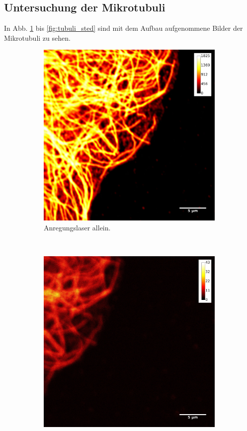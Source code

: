 \subsection{Untersuchung der Mikrotubuli}
In Abb. \ref{fig:nosted} bis \ref{fig:tubuli_sted} sind mit dem Aufbau aufgenommene Bilder der Mikrotubuli zu sehen.

\begin{figure}
\centering
\begin{subfigure}{0.3\textwidth}
	\includegraphics[width=\textwidth]{plots/normal_noSTED_measurement_with_bar.jpg}
	\caption{Anregungslaser allein.}\label{fig:nosted}
\end{subfigure}
~
\begin{subfigure}{0.3\textwidth}
	\includegraphics[width=\textwidth]{plots/normal_onlySTED_measurement_with_bar.jpg}

\end{subfigure}
\end{figure}
